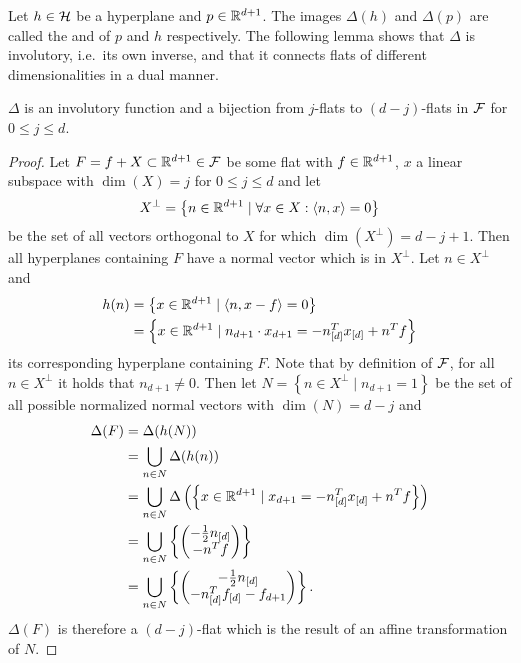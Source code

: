 Let $h \in \mathcal{H}$ be a hyperplane and $p \in \mathbb{R}^{d+1}$. The images $\Delta(h)$ and $\Delta(p)$ are called the  and  of $p$ and $h$ respectively.
The following lemma shows that $\Delta$ is involutory, i.e.~its own inverse, and that it connects flats of different dimensionalities in a dual manner.
\begin{lemma}
    \label{lem:deltainvolutory}
    $\Delta$ is an involutory function and a bijection from $j$-flats to $(d-j)$-flats in $\mathcal{F}$ for $0 \leq j \leq d$.
\end{lemma}
\begin{proof}
    Let $F = f + X \subset \mathbb{R}^{d+1} \in \mathcal{F}$ be some flat with $f \in \mathbb{R}^{d+1}$, $x$ a linear subspace with $\dim(X) = j$ for $0 \leq j \leq d$ and let
    \begin{align}
        X^\bot = \left\{ n \in \mathbb{R}^{d+1} \mid \forall x \in X : \left\langle n, x \right\rangle = 0 \right\}
    \end{align}
    be the set of all vectors orthogonal to $X$ for which $\dim(X^\bot) = d - j + 1$.
    Then all hyperplanes containing $F$ have a normal vector which is in $X^\bot$.
    Let $n \in X^\bot$ and
    \begin{align}
        h(n) &= \left\{x \in \mathbb{R}^{d+1} \mid \left\langle n, x - f \right\rangle = 0\right\}\\
        &= \left\{ x \in \mathbb{R}^{d+1} \mid n_{d+1} \cdot x_{d+1} = -n_{[d]}^Tx_{[d]} + n^Tf \right\}
    \end{align}
    its corresponding hyperplane containing $F$.
    Note that by definition of $\mathcal{F}$, for all $n \in X^\bot$ it holds that $n_{d+1} \neq 0$.
    Then let $N = \left\{ n \in X^\bot \mid n_{d+1} = 1 \right\}$ be the set of all possible normalized normal vectors with $\dim(N) = d - j$ and
    \begin{align}
        \Delta(F) &= \Delta(h(N))\\
        &= \bigcup_{n \in N} \Delta(h(n)) \\
        &= \bigcup_{n \in N} \Delta \left( \left\{ x \in \mathbb{R}^{d+1} \mid x_{d+1} = -n_{[d]}^Tx_{[d]} + n^Tf \right\} \right) \\
        &= \bigcup_{n \in N} \left\{ \begin{pmatrix} -\frac{1}{2} n_{[d]}\\ - n^T f \end{pmatrix} \right\} \\
        &= \bigcup_{n \in N} \left\{ \begin{pmatrix} -\frac{1}{2} n_{[d]}\\ - n_{[d]}^T f_{[d]} - f_{d+1} \end{pmatrix} \right\}.
    \end{align}
    $\Delta(F)$ is therefore a $(d - j)$-flat which is the result of an affine transformation of $N$.


\end{proof}
